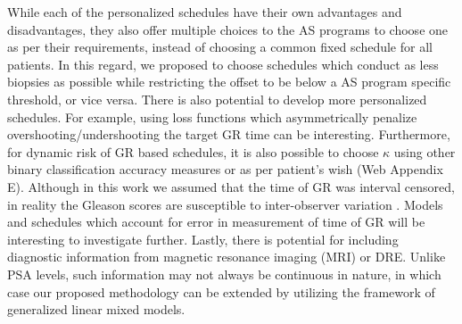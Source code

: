 While each of the personalized schedules have their own advantages and disadvantages, they also offer multiple choices to the AS programs to choose one as per their requirements, instead of choosing a common fixed schedule for all patients. In this regard, we proposed to choose schedules which conduct as less biopsies as possible while restricting the offset to be below a AS program specific threshold, or vice versa. There is also potential to develop more personalized schedules. For example, using loss functions which asymmetrically penalize overshooting/undershooting the target GR time can be interesting. Furthermore, for dynamic risk of GR based schedules, it is also possible to choose $\kappa$ using other binary classification accuracy measures or as per patient's wish (Web Appendix E). Although in this work we assumed that the time of GR was interval censored, in reality the Gleason scores are susceptible to inter-observer variation \citep{Gleason_interobs_var}. Models and schedules which account for error in measurement of time of GR will be interesting to investigate further. Lastly, there is potential for including diagnostic information from magnetic resonance imaging (MRI) or DRE. Unlike PSA levels, such information may not always be continuous in nature, in which case our proposed methodology can be extended by utilizing the framework of generalized linear mixed models.